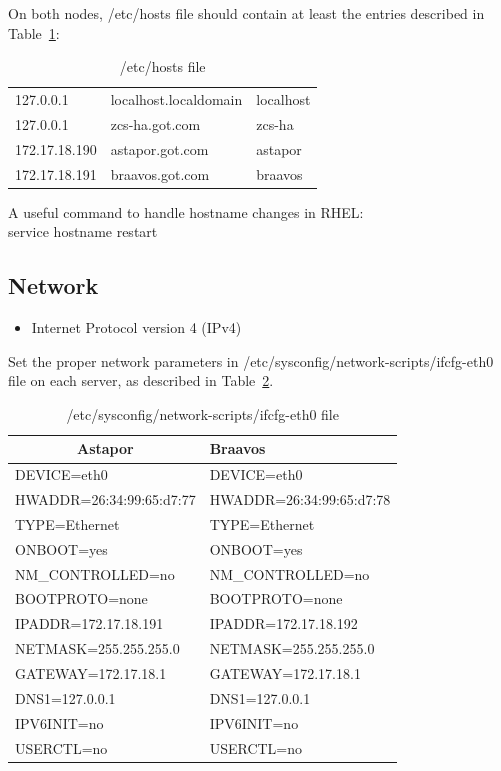 \documentclass[a4paper, 12pt]{book}
\begin{document}
\noindent On both nodes, /etc/hosts file should contain at least the entries described in Table~\ref{table:hosts}:

\begin{table}
  \centering
  \begin{tabular}{ | l l l | }
    \hline    
    127.0.0.1     & localhost.localdomain & localhost \\
    127.0.0.1     & zcs-ha.got.com        & zcs-ha\\
	172.17.18.190 & astapor.got.com       & astapor\\
	172.17.18.191 & braavos.got.com       & braavos\\
    \hline
  \end{tabular}
\caption{/etc/hosts file}
\label{table:hosts}
\end{table}

\noindent A useful command to handle hostname changes in RHEL:\\
service hostname restart\\


\subsection{Network}
\label{sec:network}

\begin{itemize}
	\item Internet Protocol version 4 (IPv4)
\end{itemize}

\noindent Set the proper network parameters in /etc/sysconfig/network-scripts/ifcfg-eth0 file on each server, as described in Table~\ref{table:ifcfg}.


\begin{table}
  \centering
  \begin{tabular}{ | l | l | }
    \hline
    \multicolumn{1}{|c|}{Astapor} & Braavos \\
    \hline
    DEVICE=eth0 & DEVICE=eth0 \\
    HWADDR=26:34:99:65:d7:77 & HWADDR=26:34:99:65:d7:78\\
    TYPE=Ethernet & TYPE=Ethernet\\
    ONBOOT=yes & ONBOOT=yes\\
    NM\_CONTROLLED=no & NM\_CONTROLLED=no\\
    BOOTPROTO=none & BOOTPROTO=none\\
    IPADDR=172.17.18.191 & IPADDR=172.17.18.192\\
    NETMASK=255.255.255.0 & NETMASK=255.255.255.0\\
    GATEWAY=172.17.18.1	& GATEWAY=172.17.18.1\\
	DNS1=127.0.0.1 & DNS1=127.0.0.1\\
	IPV6INIT=no & IPV6INIT=no\\
	USERCTL=no & USERCTL=no\\
    \hline
  \end{tabular}
\caption{/etc/sysconfig/network-scripts/ifcfg-eth0 file}
\label{table:ifcfg}
\end{table}
\end{document}
